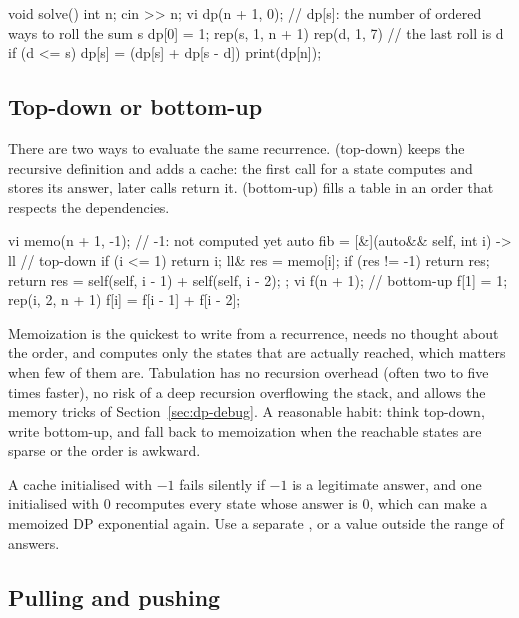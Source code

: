 \begin{code}
void solve() {
    int n;
    cin >> n;
    vi dp(n + 1, 0);  // dp[s]: the number of ordered ways to roll the sum s
    dp[0] = 1;
    rep(s, 1, n + 1) rep(d, 1, 7)  // the last roll is d
        if (d <= s) dp[s] = (dp[s] + dp[s - d]) %
    print(dp[n]);
}
\end{code}

\subsection{Top-down or bottom-up}

There are two ways to evaluate the same recurrence.  (top-down) keeps the recursive definition and adds a cache:
the first call for a state computes and stores its answer, later calls return it.  (bottom-up) fills a table in an
order that respects the dependencies.

\begin{code}
vi memo(n + 1, -1);  // -1: not computed yet
auto fib = [&](auto&& self, int i) -> ll {  // top-down
    if (i <= 1) return i;
    ll& res = memo[i];
    if (res != -1) return res;
    return res = self(self, i - 1) + self(self, i - 2);
};
vi f(n + 1);  // bottom-up
f[1] = 1;
rep(i, 2, n + 1) f[i] = f[i - 1] + f[i - 2];
\end{code}

Memoization is the quickest to write from a recurrence, needs no thought about the order, and computes only the states that are
actually reached, which matters when few of them are. Tabulation has no recursion overhead (often two to five times faster), no
risk of a deep recursion overflowing the stack, and allows the memory tricks of Section~\ref{sec:dp-debug}. A reasonable habit:
think top-down, write bottom-up, and fall back to memoization when the reachable states are sparse or the order is awkward.

\begin{pitfall}
A cache initialised with $-1$ fails silently if $-1$ is a legitimate answer, and one initialised with 0 recomputes every state
whose answer is 0, which can make a memoized DP exponential again. Use a separate , or a value outside the
range of answers.
\end{pitfall}

\subsection{Pulling and pushing}

